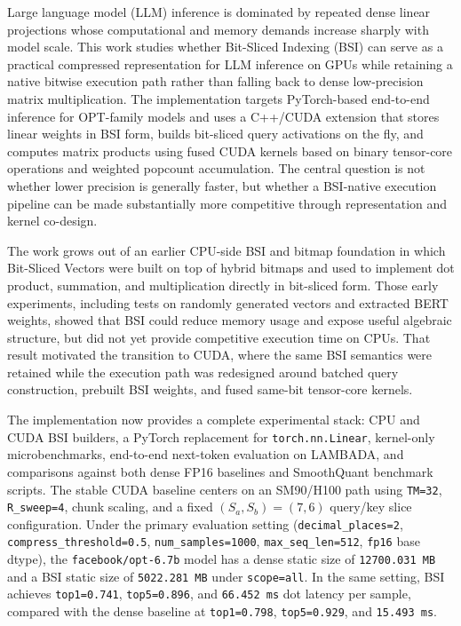 Large language model (LLM) inference is dominated by repeated dense linear projections whose computational and memory demands increase sharply with model scale. This work studies whether Bit-Sliced Indexing (BSI) can serve as a practical compressed representation for LLM inference on GPUs while retaining a native bitwise execution path rather than falling back to dense low-precision matrix multiplication. The implementation targets PyTorch-based end-to-end inference for OPT-family models and uses a C++/CUDA extension that stores linear weights in BSI form, builds bit-sliced query activations on the fly, and computes matrix products using fused CUDA kernels based on binary tensor-core operations and weighted popcount accumulation. The central question is not whether lower precision is generally faster, but whether a BSI-native execution pipeline can be made substantially more competitive through representation and kernel co-design.

The work grows out of an earlier CPU-side BSI and bitmap foundation in which Bit-Sliced Vectors were built on top of hybrid bitmaps and used to implement dot product, summation, and multiplication directly in bit-sliced form. Those early experiments, including tests on randomly generated vectors and extracted BERT weights, showed that BSI could reduce memory usage and expose useful algebraic structure, but did not yet provide competitive execution time on CPUs. That result motivated the transition to CUDA, where the same BSI semantics were retained while the execution path was redesigned around batched query construction, prebuilt BSI weights, and fused same-bit tensor-core kernels.

The implementation now provides a complete experimental stack: CPU and CUDA BSI builders, a PyTorch replacement for \texttt{torch.nn.Linear}, kernel-only microbenchmarks, end-to-end next-token evaluation on LAMBADA, and comparisons against both dense FP16 baselines and SmoothQuant benchmark scripts. The stable CUDA baseline centers on an SM90/H100 path using \texttt{TM=32}, \texttt{R\_sweep=4}, chunk scaling, and a fixed \((S_a,S_b)=(7,6)\) query/key slice configuration. Under the primary evaluation setting (\texttt{decimal\_places=2}, \texttt{compress\_threshold=0.5}, \texttt{num\_samples=1000}, \texttt{max\_seq\_len=512}, \texttt{fp16} base dtype), the \texttt{facebook/opt-6.7b} model has a dense static size of \texttt{12700.031 MB} and a BSI static size of \texttt{5022.281 MB} under \texttt{scope=all}. In the same setting, BSI achieves \texttt{top1=0.741}, \texttt{top5=0.896}, and \texttt{66.452 ms} dot latency per sample, compared with the dense baseline at \texttt{top1=0.798}, \texttt{top5=0.929}, and \texttt{15.493 ms}.

